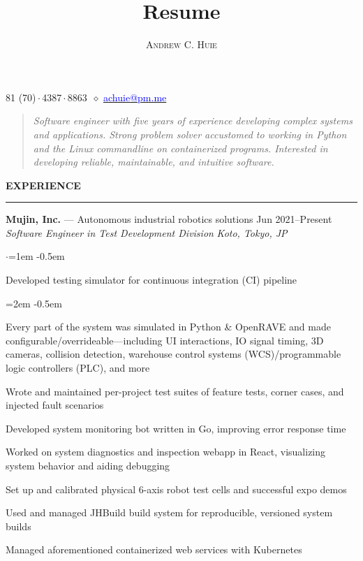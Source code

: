 \documentclass[10pt, a4paper]{article}
\makeatletter
\newenvironment{aSection}[1]{
    \medskip \textbf{\uppercase{#1}}
    \smallskip
    \hrule
    \begin{list}{}{
            \setlength{\leftmargin}{1.5em}
        }
    \item[]
    }{
    \end{list}
}
\newenvironment{expSubsection}[4]{
    {#1} \hfill {#2} \\
    \textit{#3} \hfill \textit{#4}
    \smallskip
    \begin{list}{$\cdot$}{\leftmargin=1em}
    \itemsep -0.5em \vspace{-0.5em}
    }{
    \end{list}
    \vspace{0.5em}
}
\newenvironment{subList}{
    \begin{list}{\raisebox{.4ex}{\tiny$\succ$}}{\leftmargin=2em}
    \itemsep -0.5em \vspace{-0.5em}
    }{
    \end{list}
}
\renewcommand{\maketitle}{
    \begin{center}
        {\Huge\theauthor}

        \vspace{0.25em}

        \raisebox{.3ex}{\footnotesize+}81 (70)\,$\cdot$\,4387\,$\cdot$\,8863~$\diamond$
        \href{mailto:achuie@pm.me}{\textcolor{blue}{
            achuie@pm.me
        }}
    \end{center}

    \vspace{1em}

    \begingroup
    \addtolength\leftmargini{1.5em}
    \begin{quote}
        \textit{Software engineer with five years of experience developing complex systems and
            applications. Strong problem solver accustomed to working in Python and the Linux
            commandline on containerized programs. Interested in developing reliable, maintainable,
            and intuitive software.}
    \end{quote}
    \endgroup
}
\makeatother
\begin{document}
\title{Resume}
\author{\textsc{Andrew C. Huie}}

\maketitle

\begin{aSection}{Experience}
    \begin{expSubsection}
        {\textbf{Mujin, Inc.} --- Autonomous industrial robotics solutions}
        {Jun 2021--Present}
        {Software Engineer in Test Development Division}
        {Koto, Tokyo, JP}
    \item Developed testing simulator for continuous integration (CI) pipeline
        \begin{subList}
            \item Every part of the system was simulated in Python \& OpenRAVE and made
                configurable/overrideable---including UI interactions, IO signal timing, 3D cameras,
                collision detection, warehouse control systems (WCS)/programmable logic controllers
                (PLC), and more

            \item Wrote and maintained per-project test suites of feature tests, corner cases, and injected fault scenarios
        \end{subList}
    \item Developed system monitoring bot written in Go, improving error response time
    \item Worked on system diagnostics and inspection webapp in React, visualizing system behavior
        and aiding debugging
    \item Set up and calibrated physical 6-axis robot test cells and successful expo demos
    \item Used and managed JHBuild build system for reproducible, versioned system builds
    \item Managed aforementioned containerized web services with Kubernetes
    \end{expSubsection}


\end{aSection}
\end{document}
